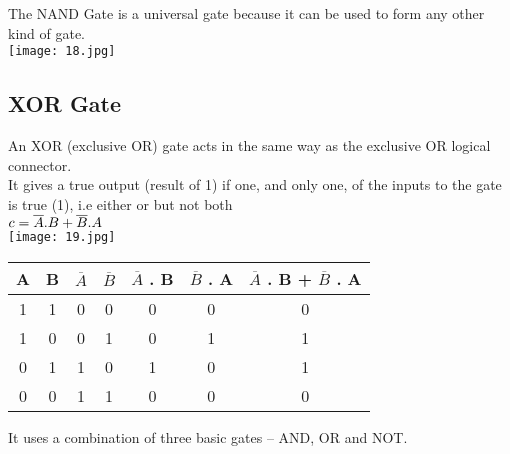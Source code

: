 \documentclass[10pt,a4paper,onecolumn]{article}
\begin{document}
\color{red}The NAND Gate is a universal gate because it can be used to form any other kind of gate. \\ \color{black}
\texttt{[image: 18.jpg]}

\subsection{XOR Gate}
An XOR (exclusive OR) gate acts in the same way as the exclusive OR logical connector. \\
It gives a true output (result of 1) if one, and only one, of the inputs to the gate is true (1), i.e either or but not both \\
\color{red}$\\ c = \overline{A}.B + \overline{B}.A$ \\ \color{black}
\texttt{[image: 19.jpg]}
\begin{table}[h!]
	\begin{center}
		\begin{tabular}{c|c|c|c|c|c|c}
			\textbf{A} & \textbf{B} & \textbf{$\overline{A}$} & \textbf{$\overline{B}$} & \textbf{$\overline{A}$ . B} & \textbf{$\overline{B}$ . A} & \textbf{$\overline{A}$ . B} + \textbf{$\overline{B}$ . A}\\
			\hline
			1 & 1 & 0 & 0 & 0 & 0 & 0\\
			\hline
			1 & 0 & 0 & 1 & 0 & 1 & 1\\
			\hline
			0 & 1 & 1 & 0 & 1 & 0 & 1\\
			\hline
			0 & 0 & 1 & 1 & 0 & 0 & 0\\
			\hline
		\end{tabular}
	\end{center}
\end{table} 
\color{red}It uses a combination of three basic gates – AND, OR and NOT. \\ \color{black}
\end{document}
